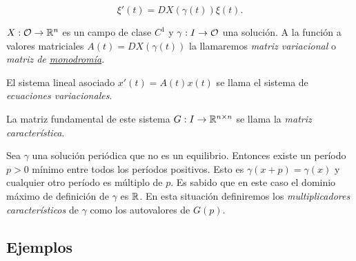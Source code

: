 \[\xi'(t)=DX(\gamma(t))\xi(t).\]


$X:\mathcal{O}\to\mathbb{R}^n$ es un campo de clase $C^1$ y $\gamma:I\to\mathcal{O}$ una solución. A la función a valores matriciales
$A(t)=DX(\gamma(t))$ la llamaremos \emph{matriz variacional} o \emph{matriz de \href{http://es.wikipedia.org/wiki/Monodromía}{monodromía}}. 

El sistema lineal asociado
$x'(t)=A(t)x(t)$ se llama el sistema de \emph{ecuaciones variacionales}. 
 
La matriz fundamental de este sistema 
$G:I\to\mathbb{R}^{n\times n}$ se llama la \emph{matriz característica}. 

Sea $\gamma$ una solución periódica que no es un equilibrio. Entonces existe un período $p>0$ mínimo
entre todos los períodos positivos. Esto es $\gamma(x+p)=\gamma(x)$  y cualquier otro período es múltiplo de $p$. 
Es sabido que en este caso el dominio máximo de definición de $\gamma$ es $\mathbb{R}$. En esta situación definiremos
los \emph{multiplicadores característicos} de $\gamma$ como los autovalores de $G(p)$.




\subsection{Ejemplos}

